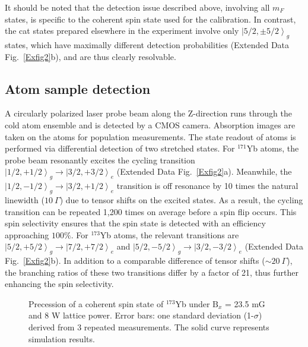 \documentclass[pdflatex,sn-nature,centre]{sn-jnl}%
\begin{document}
It should be noted that the detection issue described above, involving all $m_F$ states, is specific to the coherent spin state used for the calibration. In contrast, the cat states prepared elsewhere in the experiment involve only $\left\vert5/2,\pm5/2\right\rangle_g$ states, which have maximally different detection probabilities (Extended Data Fig.~\ref{Exfig2}b), and are thus clearly resolvable.


\subsection*{Atom sample detection}\label{readout}

A circularly polarized laser probe beam along the Z-direction runs through the cold atom ensemble and is detected by a CMOS camera. Absorption images are taken on the atoms for population measurements. The state readout of atoms is performed via differential detection of two stretched states. For $^{171}$Yb atoms, the probe beam resonantly excites the cycling transition $\left\vert1/2,+1/2\right\rangle_g \rightarrow \left\vert{3/2},+3/2\right\rangle_e$ (Extended Data Fig.~\ref{Exfig2}a). Meanwhile, the $\left\vert1/2,-1/2\right\rangle_g \rightarrow \left\vert3/2,+1/2\right\rangle_e$ transition is off resonance by 10 times the natural linewidth ($10\ \Gamma$) due to tensor shifts on the excited states. As a result, the cycling transition can be repeated 1,200 times on average before a spin flip occurs. This spin selectivity ensures that the spin state is detected with an efficiency approaching $100\%$. For $^{173}$Yb atoms, the relevant transitions are $\left\vert5/2,+5/2\right\rangle_g \rightarrow \left\vert7/2,+7/2\right\rangle_e$ and $\left\vert5/2,-5/2\right\rangle_g \rightarrow \left\vert3/2,-3/2\right\rangle_e$ (Extended Data Fig.~\ref{Exfig2}b). In addition to a comparable difference of tensor shifts ($\sim20\ \Gamma$), the branching ratios of these two transitions differ by a factor of 21, thus further enhancing the spin selectivity.

\renewcommand{\figurename}{Extended Data Fig.}
\setcounter{figure}{0}

\begin{figure}[htbp!]
    \centering
    \caption {Precession of a coherent spin state of $^{173}$Yb under $\mathrm B_{\mathit x}$ = 23.5 mG and 8 W lattice power. Error bars: one standard deviation (1-$\sigma$) derived from 3 repeated measurements. The solid curve represents simulation results.}
    \label{Exfig1}
\end{figure}
\end{document}
